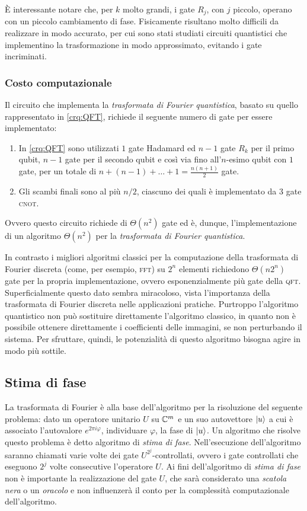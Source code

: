 È interessante notare che, per $k$ molto grandi, i gate $R_j$, con $j$ piccolo, operano con un piccolo cambiamento di fase.
Fisicamente risultano molto difficili da realizzare in modo accurato, per cui sono stati studiati circuiti quantistici che implementino la trasformazione in modo approssimato, evitando i gate incriminati.

\subsubsection{Costo computazionale}
Il circuito che implementa la \textit{trasformata di Fourier quantistica}, basato su quello rappresentato in \eqref{crq:QFT}, richiede il seguente numero di gate per essere implementato:
\begin{enumerate}
 \item In \eqref{crq:QFT} sono utilizzati $1$ gate Hadamard ed $n-1$ gate $R_k$ per il primo qubit, $n-1$ gate per il secondo qubit e così via fino all'$n$-esimo qubit con $1$ gate, per un totale di $n + (n-1) + \dots + 1 = \frac{n(n+1)}{2}$ gate.
 \item Gli scambi finali sono al più $n/2$, ciascuno dei quali è implementato da $3$ gate \textsc{cnot}. 
\end{enumerate}
Ovvero questo circuito richiede di $\Theta(n^2)$ gate ed è, dunque, l'implementazione di un algoritmo $\Theta(n^2)$ per la \textit{trasformata di Fourier quantistica}.

In contrasto i migliori algoritmi classici per la computazione della trasformata di Fourier discreta (come, per esempio, \textsc{fft}) su $2^n$ elementi richiedono $\Theta(n2^n)$ gate per la propria implementazione, ovvero esponenzialmente più gate della \textsc{qft}. Superficialmente questo dato sembra miracoloso, vista l'importanza della trasformata di Fourier discreta nelle applicazioni pratiche.
Purtroppo l'algoritmo quantistico non può sostituire direttamente l'algoritmo classico, in quanto non è possibile ottenere direttamente i coefficienti delle immagini, se non perturbando il sistema.
Per sfruttare, quindi, le potenzialità di questo algoritmo bisogna agire in modo più sottile.

\subsection{Stima di fase}\label{sec:alg_phase}
La trasformata di Fourier è alla base dell'algoritmo per la risoluzione del seguente problema: dato un operatore unitario $U$ su $\mathbb{C}^{m}$ e un suo autovettore $\ket{u}$ a cui è associato l'autovalore $e^{2 \pi i \varphi}$, individuare $\varphi$, la fase di $\ket{u}$.
Un algoritmo che risolve questo problema è detto algoritmo di \textit{stima di fase}.
Nell'esecuzione dell'algoritmo saranno chiamati varie volte dei gate $U^{2^j}$-controllati, ovvero i gate controllati che eseguono $2^j$ volte consecutive l'operatore $U$.
Ai fini dell'algoritmo di \textit{stima di fase} non è importante la realizzazione del gate $U$, che sarà considerato una \textit{scatola nera} o un \textit{oracolo} e non influenzerà il conto per la complessità computazionale dell'algoritmo.

